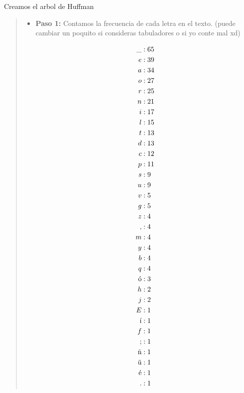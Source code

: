 \textcolor{bibi}{Creamos el arbol de Huffman}
\begin{quote}
    \begin{itemize}
        \item \textbf{Paso 1:} Contamos la frecuencia de cada letra en el texto. (puede cambiar un poquito si consideras tabuladores o si yo conte mal xd)

        \begin{align*}
            \char`_ &: 65 \\
            e &: 39 \\
            a &: 34 \\
            o &: 27 \\
            r &: 25 \\
            n &: 21 \\
            i &: 17 \\
            l &: 15 \\
            t &: 13 \\
            d &: 13 \\
            c &: 12 \\
            p &: 11 \\
            s &: 9 \\
            u &: 9 \\
            v &: 5 \\
            g &: 5 \\
            z &: 4 \\
            , &: 4 \\
            m &: 4 \\
            y &: 4 \\
            b &: 4 \\
            q &: 4 \\
            \text{ó} &: 3 \\
            h &: 2 \\
            j &: 2 \\
            E &: 1 \\
            \text{í} &: 1 \\
            f &: 1 \\
            ; &: 1 \\
            \text{ñ} &: 1 \\
            \text{ü} &: 1 \\
            \text{é} &: 1 \\
            . &: 1 \\
        \end{align*}

\end{itemize}
\end{quote}
